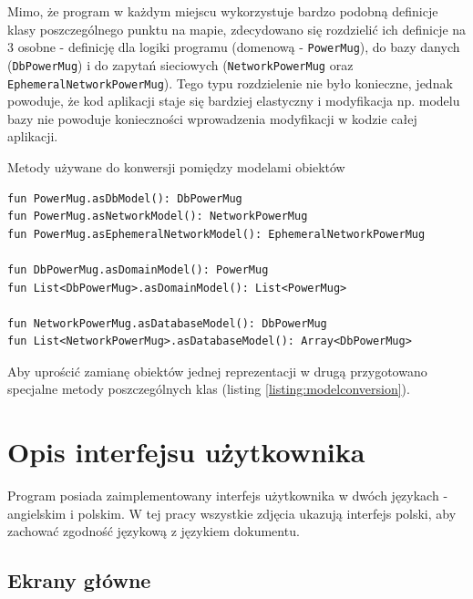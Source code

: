 \documentclass[polish,polish,a4paper,12pt]{article}
\let\sectioncmd\section
\renewcommand{\section}{\clearpage\sectioncmd}
\begin{document}
	Mimo, że program w każdym miejscu wykorzystuje bardzo podobną definicje klasy poszczególnego punktu na mapie, zdecydowano się rozdzielić ich definicje na 3 osobne - definicję dla logiki programu (domenową - \texttt{PowerMug}), do bazy danych (\texttt{DbPowerMug}) i do zapytań sieciowych (\texttt{NetworkPowerMug} oraz \texttt{EphemeralNetworkPowerMug}). Tego typu rozdzielenie nie było konieczne, jednak powoduje, że kod aplikacji staje się bardziej elastyczny i modyfikacja np. modelu bazy nie powoduje konieczności wprowadzenia modyfikacji w kodzie całej aplikacji.

	\begin{listing}[H]
		\caption{Metody używane do konwersji pomiędzy modelami obiektów}
		\begin{verbatim}
fun PowerMug.asDbModel(): DbPowerMug
fun PowerMug.asNetworkModel(): NetworkPowerMug
fun PowerMug.asEphemeralNetworkModel(): EphemeralNetworkPowerMug

fun DbPowerMug.asDomainModel(): PowerMug
fun List<DbPowerMug>.asDomainModel(): List<PowerMug>

fun NetworkPowerMug.asDatabaseModel(): DbPowerMug
fun List<NetworkPowerMug>.asDatabaseModel(): Array<DbPowerMug>
		\end{verbatim}
		\label{listing:modelconversion}
	\end{listing}

	Aby uprościć zamianę obiektów jednej reprezentacji w drugą przygotowano specjalne metody poszczególnych klas (listing \ref{listing:modelconversion}).

\section{Opis interfejsu użytkownika}\label{ui}

Program posiada zaimplementowany interfejs użytkownika w dwóch językach - angielskim i polskim. W tej pracy wszystkie zdjęcia ukazują interfejs polski, aby zachować zgodność językową z językiem dokumentu.

	\subsection{Ekrany główne}
\end{document}
